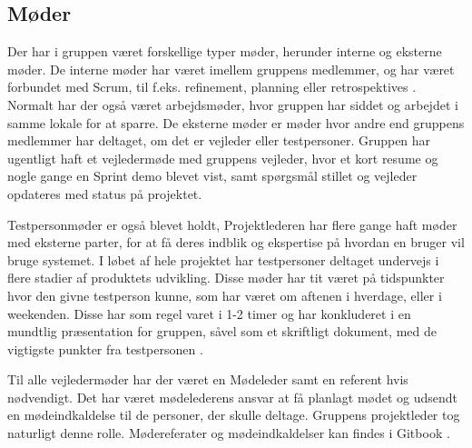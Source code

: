 \subsection{Møder}

Der har i gruppen været forskellige typer møder, herunder interne og eksterne møder. De interne møder har været imellem gruppens medlemmer, og har været forbundet med Scrum, til f.eks. refinement, planning eller retrospektives \cite[Retrospektives]{converge-terms}. Normalt har der også været arbejdsmøder, hvor gruppen har siddet og arbejdet i samme lokale for at sparre. De eksterne møder er møder hvor andre end gruppens medlemmer har deltaget, om det er vejleder eller testpersoner. Gruppen har ugentligt haft et vejledermøde med gruppens vejleder, hvor et kort resume og nogle gange en Sprint demo blevet vist, samt spørgsmål stillet og vejleder opdateres med status på projektet.

Testpersonmøder er også blevet holdt, Projektlederen har flere gange haft møder med eksterne parter, for at få deres indblik og ekspertise på hvordan en bruger vil bruge systemet. I løbet af hele projektet har testpersoner deltaget undervejs i flere stadier af produktets udvikling. Disse møder har tit været på tidspunkter hvor den givne testperson kunne, som har været om aftenen i hverdage, eller i weekenden. Disse har som regel varet i 1-2 timer og har konkluderet i en mundtlig præsentation for gruppen, såvel som et skriftligt dokument, med de vigtigste punkter fra testpersonen \cite{test-users}.

Til alle vejledermøder har der været en Mødeleder samt en referent hvis nødvendigt. Det har været mødelederens ansvar at få planlagt mødet og udsendt en mødeindkaldelse til de personer, der skulle deltage. Gruppens projektleder tog naturligt denne rolle. Mødereferater og mødeindkaldelser kan findes i Gitbook \cite{Team-Meetings}.